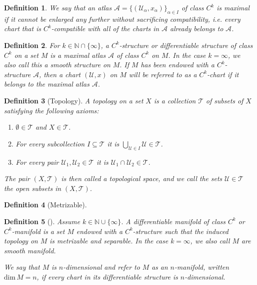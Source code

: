 \documentclass{book}
\theoremstyle{custom_definition}
\newtheorem{definition}{Definition}
\theoremstyle{custom_theorem}
\begin{document}
    \begin{definition}
        We say that an atlas \(\mathcal{A} = \{(\mathcal{U}_\alpha, x_\alpha)\}_{\alpha \in I}\) of class \(C^k\) is maximal if it cannot be enlarged any further without sacrificing compatibility, i.e. every chart that is \(C^k\)-compatible with all of the charts in \(\mathcal{A}\) already belongs to \(\mathcal{A}\).
    \end{definition}
    \begin{definition}
        For \(k \in \mathbb{N} \cap \{\infty\}\), a \(C^k\)-structure or differentiable structure of class \(C^k\) on a set \(M\) is a maximal atlas \(\mathcal{A}\) of class \(C^k\) on \(M\). In the case \(k = \infty\), we also call this a smooth structure on \(M\). If \(M\) has been endowed with a \(C^k\)-structure \(\mathcal{A}\), then a chart \((\mathcal{U}, x)\) on \(M\) will be referred to as a \(C^k\)-chart if it belongs to the maximal atlas \(\mathcal{A}\).
    \end{definition}
    \begin{definition}[Topology]
        A topology on a set \(X\) is a collection \(\mathcal{T}\) of subsets of \(X\) satisfying the following axioms:
        \begin{enumerate}
            \item \(\emptyset \in \mathcal{T}\) and \(X \in \mathcal{T}\).
            \item For every subcollection \(I \subseteq \mathcal{T}\) it is \(\bigcup_{\mathcal{U} \in I} \mathcal{U} \in \mathcal{T}\).
            \item For every pair \(\mathcal{U}_1, \mathcal{U}_2 \in \mathcal{T}\) it is \(\mathcal{U}_1 \cap \mathcal{U}_2 \in \mathcal{T}\).
        \end{enumerate}
        The pair \((X, \mathcal{T})\) is then called a topological space, and we call the sets \(\mathcal{U} \in \mathcal{T}\) the open subsets in \((X, \mathcal{T})\).
    \end{definition}
    \begin{definition}[Metrizable]
        
    \end{definition}
    \begin{definition}[]
        Assume \(k \in \mathbb{N} \cup \{\infty\}\). A differentiable manifold of class \(C^k\) or \(C^k\)-manifold is a set \(M\) endowed with a \(C^k\)-structure such that the induced topology on \(M\) is metrizable and separable. In the case \(k = \infty\), we also call \(M\) are smooth manifold.

        We say that \(M\) is \(n\)-dimensional and refer to \(M\) as an \(n\)-manifold, written \(\text{dim}\, M = n\), if every chart in its differentiable structure is \(n\)-dimensional.
    \end{definition}
\end{document}
